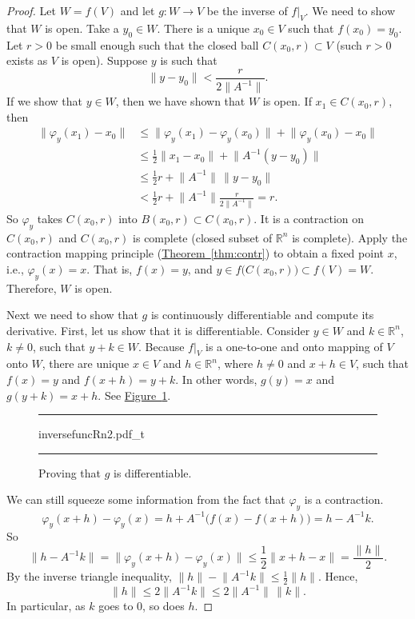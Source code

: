 \documentclass[12pt,openany]{book}
\newcommand{\snorm}[1]{\lVert {#1} \rVert}
\newcommand{\R}{{\mathbb{R}}}
\theoremstyle{plain}
\theoremstyle{remark}
\theoremstyle{definition}
\newenvironment{myfig}{%
\begin{figure}[h!t]
\noindent\rule{\textwidth}{0.5pt}\vspace{12pt}\par\centering}%
{\par\noindent\rule{\textwidth}{0.5pt}
\end{figure}}
\theoremstyle{exercise}
\theoremstyle{example}
\newcommand{\figureref}[1]{\hyperref[#1]{Figure~\ref*{#1}}}
\newcommand{\thmref}[1]{\hyperref[#1]{Theorem~\ref*{#1}}}
\begin{document}
\begin{proof}
Let $W = f(V)$ and let $g \colon W \to V$ be the inverse of $f|_V$.
We need to show that $W$ is open.  Take a $y_0 \in W$.
There is a unique $x_0 \in V$ such that $f(x_0) = y_0$.
Let $r > 0$ be small enough such that the closed ball $C(x_0,r) \subset V$
(such $r > 0$ exists as $V$ is open).
Suppose $y$ is such that
\begin{equation*}
\snorm{y-y_0} <
\frac{r}{2\snorm{A^{-1}}} .
\end{equation*}
If we show that $y \in W$, then we have shown that $W$ is open.
If $x_1 \in
C(x_0,r)$, then
\begin{equation*}
\begin{split}
\snorm{\varphi_y(x_1)-x_0}
& \leq
\snorm{\varphi_y(x_1)-\varphi_y(x_0)} +
\snorm{\varphi_y(x_0)-x_0} \\
& \leq
\frac{1}{2}\snorm{x_1-x_0} +
\snorm{A^{-1}(y-y_0)} \\
& \leq
\frac{1}{2}r +
\snorm{A^{-1}} \, \snorm{y-y_0} \\
& <
\frac{1}{2}r +
\snorm{A^{-1}}
\frac{r}{2\snorm{A^{-1}}} = r .
\end{split}
\end{equation*}
So $\varphi_y$ takes $C(x_0,r)$ into $B(x_0,r) \subset C(x_0,r)$.  It is a
contraction on $C(x_0,r)$ and $C(x_0,r)$ is complete (closed subset of $\R^n$
is complete).
Apply the contraction mapping principle (\thmref{thm:contr})
to obtain a fixed point $x$,
i.e., $\varphi_y(x) = x$.  That is, $f(x) = y$, and $y \in
f\bigl(C(x_0,r)\bigr) \subset f(V) = W$.  Therefore, $W$ is open.

Next we need to show that $g$ is continuously differentiable and compute
its derivative.  First, let us show that it is differentiable.
Consider $y \in W$ and $k \in \R^n$, $k \neq 0$, such that $y+k \in W$.
Because $f|_V$ is a one-to-one and onto mapping of $V$ onto $W$,
there are unique
$x \in V$ and $h \in \R^n$, where $h \neq 0$ and $x+h \in V$, such that
$f(x) = y$ and $f(x+h) = y+k$.
In other words, $g(y) = x$ and $g(y+k) = x+h$.  See
\figureref{fig:inversefuncRn2}.
\begin{myfig}
{inversefuncRn2.pdf_t}
\caption{Proving that $g$ is differentiable.\label{fig:inversefuncRn2}}
\end{myfig}

We can still
squeeze some information from the fact that $\varphi_y$ is a contraction.
\begin{equation*}
\varphi_y(x+h)-\varphi_y(x) = h + A^{-1} \bigl( f(x)-f(x+h) \bigr) = h - A^{-1} k .
\end{equation*}
So
\begin{equation*}
\snorm{h-A^{-1}k} = \snorm{\varphi_y(x+h)-\varphi_y(x)} \leq
\frac{1}{2}\snorm{x+h-x} = \frac{\snorm{h}}{2}.
\end{equation*}
By the inverse triangle inequality, $\snorm{h} - \snorm{A^{-1}k} \leq
\frac{1}{2}\snorm{h}$.
Hence,
\begin{equation*}
\snorm{h} \leq 2 \snorm{A^{-1}k} \leq 2 \snorm{A^{-1}} \, \snorm{k}.
\end{equation*}
In particular, as $k$ goes to $0$, so does $h$.


\end{proof}
\end{document}
